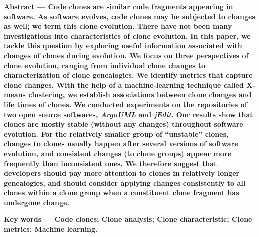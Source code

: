 \documentclass[twoside]{article}
\begin{document}
\begin{multicols}{2}%

{\footnotesize\bf Abstract --- {\footnotesize\bf
Code clones are similar code fragments appearing in software. As software evolves, code clones may be subjected to changes as well; we term this clone evolution. %
There have not been many investigations into characteristics of clone evolution. In this paper, we tackle this question by exploring useful information associated with changes of clones during evolution. We focus on three perspectives of clone evolution, ranging from individual clone changes to characterization of clone genealogies. We identify metrics that capture clone changes. With the help of a machine-learning technique called X-means clustering, we establish associations between clone changes and life times of clones. We conducted experiments on the repositories of two open source softwares, {\em ArgoUML} and {\em jEdit}.  Our results show that clones are mostly stable (without any changes) throughout software evolution. For the relatively smaller group of ``unstable'' clones, changes to clones usually happen after several versions of software evolution, and consistent changes (to clone groups) appear more frequently than inconsistent ones. We therefore suggest that developers should pay more attention to clones in relatively longer genealogies, and should consider applying changes consistently to all clones within a clone group when a constituent clone fragment has undergone change. %
}

\bf Key words --- {\footnotesize\bf
Code clones; Clone analysis; Clone characteristic;  Clone metrics; Machine learning.}}









\end{multicols}
\end{document}
